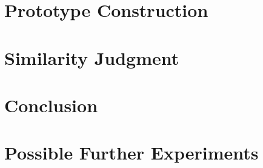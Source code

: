 \documentclass[conference]{IEEEtran}
\begin{document}
\section{Prototype Construction}
\section{Similarity Judgment}


\section{Conclusion}
\section{Possible Further Experiments}



\end{document}

